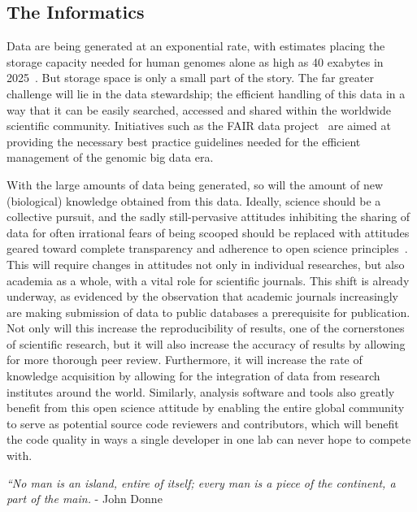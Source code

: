 \subsection{The Informatics}
Data are being generated at an exponential rate, with estimates placing the storage capacity needed for human genomes alone as high as 40 exabytes in 2025~\cite{stephens2015}. But storage space is only a small part of the story. The far greater challenge will lie in the data stewardship; the efficient handling of this data in a way that it can be easily searched, accessed and shared within the worldwide scientific community. Initiatives such as the FAIR data project~\cite{wilkinson2016fair} are aimed at providing the necessary best practice guidelines needed for the efficient management of the genomic big data era.


With the large amounts of data being generated, so will the amount of new (biological) knowledge obtained from this data. Ideally, science should be a collective pursuit, and the sadly still-pervasive attitudes inhibiting the sharing of data for often irrational fears of being scooped should be replaced with attitudes geared toward complete transparency and adherence to open science principles~\cite{TODO}. This will require changes in attitudes not only in individual researches, but also academia as a whole, with a vital role for scientific journals. This shift is already underway, as evidenced by the observation that academic journals increasingly are making submission of data to public databases a prerequisite for publication. Not only will this increase the reproducibility of results, one of the cornerstones of scientific research, but it will also increase the accuracy of results by allowing for more thorough peer review. Furthermore, it will increase the rate of knowledge acquisition by allowing for the integration of data from research institutes around the world. Similarly, analysis software and tools also greatly benefit from this open science attitude by enabling the entire global community to serve as potential source code reviewers and contributors, which will benefit the code quality in ways a single developer in one lab can never hope to compete with.


\begin{center}
\emph{“No man is an island, entire of itself; every man is a piece of the continent, a part of the main.} - John Donne
\end{center}



